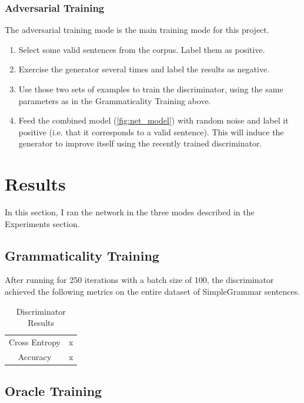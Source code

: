 \documentclass[12pt]{article}
\begin{document}
\subsubsection{Adversarial Training}

The adversarial training mode is the main training mode for this project.

\begin{enumerate}
    \item Select some valid sentences from the corpus. Label them as positive.
    \item Exercise the generator several times and label the results as negative.
    \item Use those two sets of examples to train the discriminator, using the same parameters as in the Grammaticality Training above.
    \item Feed the combined model (\ref{fig:net_model}) with random noise and label it positive (i.e. that it corresponds to a valid sentence). This will induce the generator to improve itself using the recently trained discriminator.
\end{enumerate}

\section{Results}

In this section, I ran the network in the three modes described in the Experiments section.

\subsection{Grammaticality Training}

After running for 250 iterations with a batch size of 100, the discriminator achieved the following metrics on the entire dataset of SimpleGrammar sentences.

\begin{table}
    \centering
    \begin{tabular}{c|c}
        \hline
        Cross Entropy & x \\
        Accuracy & x \\
    \end{tabular}
    \caption{Discriminator Results}
    \label{tab:disc_results}
\end{table}

\subsection{Oracle Training}
\end{document}
